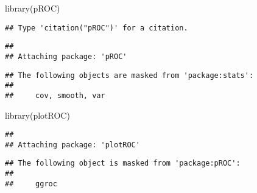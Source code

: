 \documentclass[
]{article}
\newenvironment{Shaded}{\begin{snugshade}}{\end{snugshade}}
\newcommand{\FunctionTok}[1]{\textcolor[rgb]{0.00,0.00,0.00}{#1}}
\newcommand{\NormalTok}[1]{#1}
\begin{document}
\begin{Shaded}
\begin{Highlighting}[]
\FunctionTok{library}\NormalTok{(pROC)}
\end{Highlighting}
\end{Shaded}

\begin{verbatim}
## Type 'citation("pROC")' for a citation.
\end{verbatim}

\begin{verbatim}
## 
## Attaching package: 'pROC'
\end{verbatim}

\begin{verbatim}
## The following objects are masked from 'package:stats':
## 
##     cov, smooth, var
\end{verbatim}

\begin{Shaded}
\begin{Highlighting}[]
\FunctionTok{library}\NormalTok{(plotROC)}
\end{Highlighting}
\end{Shaded}

\begin{verbatim}
## 
## Attaching package: 'plotROC'
\end{verbatim}

\begin{verbatim}
## The following object is masked from 'package:pROC':
## 
##     ggroc
\end{verbatim}
\end{document}
